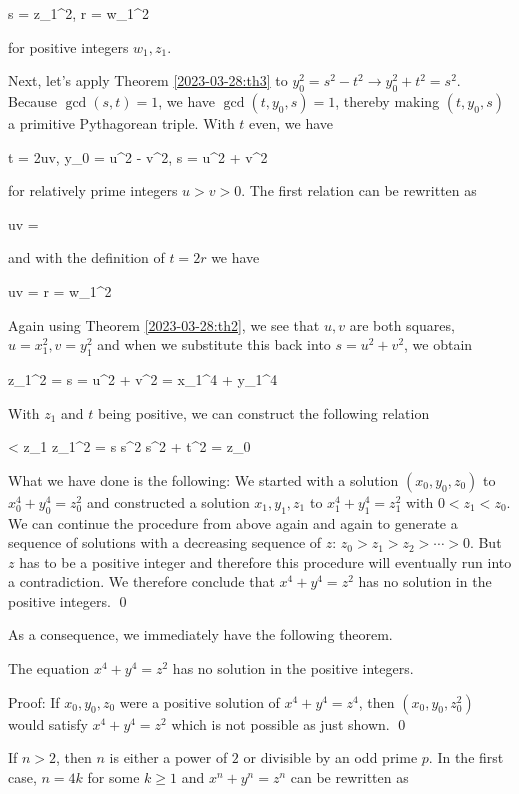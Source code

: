 \bee
s = z_1^2, \quad r = w_1^2
\eee

for positive integers $w_1, z_1$.

Next, let's apply Theorem \ref{2023-03-28:th3} to $y_0^2 = s^2 - t^2 \rightarrow y_0^2 + t^2 = s^2$. Because $\gcd(s,t) = 1$, we have $\gcd(t, y_0, s) = 1$, thereby making $(t, y_0, s)$ a primitive Pythagorean triple. With $t$ even, we have

\bee
t = 2uv, \quad y_0 = u^2 - v^2, \quad s = u^2 + v^2
\eee

for relatively prime integers $u > v > 0$. The first relation can be rewritten as

\bee
uv = 
\eee

and with the definition of $t = 2r$ we have 

\bee
uv = r = w_1^2
\eee

Again using Theorem \ref{2023-03-28:th2}, we see that $u, v$ are both squares, $u=x_1^2, v = y_1^2$ and when we substitute this back into $s = u^2 + v^2$, we obtain

\bee
z_1^2 = s = u^2 + v^2 = x_1^4 + y_1^4
\eee

With $z_1$ and $t$ being positive, we can construct the following relation

 < z_1 \leq z_1^2  = s \leq s^2 \leq s^2 + t^2 = z_0
\eee

What we have done is the following: We started with a solution $(x_0, y_0, z_0)$ to $x_0^4 + y_0^4 = z_0^2$ and constructed a solution $x_1, y_1, z_1$ to $x_1^4 + y_1^4 = z_1^2$ with $0 < z_1 < z_0$. We can continue the procedure from above again and again to generate a sequence of solutions with a decreasing sequence of $z$: $z_0 > z_1 > z_2 > \cdots > 0$. But $z$ has to be a positive integer and therefore this procedure will eventually run into a contradiction. We therefore conclude that $x^4 + y^4 = z^2$ has no solution in the positive integers. \qed

As a consequence, we immediately have the following theorem.

\begin{theorem}
    The equation $x^4 + y^4 = z^2$ has no solution in the positive integers.
\end{theorem}

Proof: If $x_0, y_0, z_0$ were a positive solution of $x^4 + y^4 = z^4$, then $(x_0, y_0, z_0^2)$ would satisfy $x^4 + y^4 =z^2$ which is not possible as just shown. \qed

If $n > 2$, then $n$ is either a power of $2$ or divisible by an odd prime $p$. In the first case, $n =4k$ for some $k \geq 1$ and $x^n + y^n = z^n$ can be rewritten as

